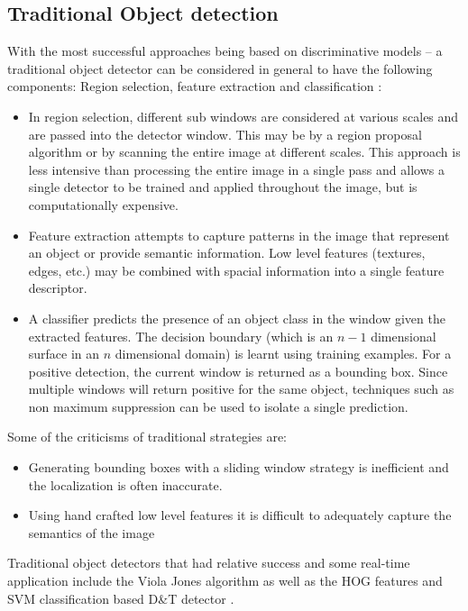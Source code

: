 \documentclass[a4paper,twoside,12pt]{report}
\begin{document}
\subsection{Traditional Object detection}

With the most successful approaches being based on discriminative models -- a traditional object detector can be considered in general to have the following components:  Region selection, feature extraction and classification \citep{deepreview}:

\begin{itemize}
    \item In region selection, different sub windows are considered at various scales and are passed into the detector window. This may be by a region proposal algorithm or by scanning the entire image at different scales. This approach is less intensive than processing the entire image in a single pass and allows a single detector to be trained and applied throughout the image, but is computationally expensive. 
    \item Feature extraction attempts to capture patterns in the image that represent an object or provide semantic information. Low level features (textures, edges, etc.) may be combined with spacial information into a single feature descriptor.
    \item A classifier predicts the presence of an object class in the window given the extracted features. The decision boundary (which is an $n-1$ dimensional surface in an $n$ dimensional domain) is learnt using training examples. For a positive detection, the current window is returned as a bounding box. Since multiple windows will return positive for the same object, techniques such as non maximum suppression can be used to isolate a single prediction.
\end{itemize}

\noindent Some of the criticisms of traditional strategies are: 
\begin{itemize}
    \setlength\itemsep{0em}
    \item Generating bounding boxes with a sliding window strategy is inefficient and the localization is often inaccurate.
    \item Using hand crafted low level features it is difficult to adequately capture the semantics of the image 
\end{itemize}

Traditional object detectors that had relative success and some real-time application include the Viola Jones algorithm \citep{vjdet} as well as the HOG features and SVM classification based D\&T detector \citep{hog}. 
\end{document}
